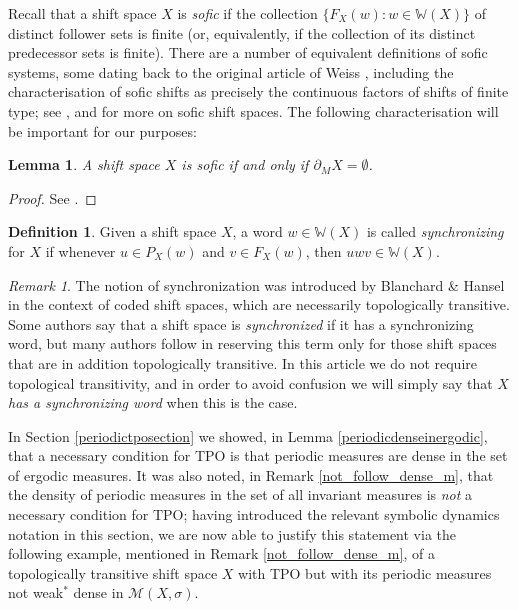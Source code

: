 \documentclass[reqno,11pt]{amsart}
\newtheorem{lem}[thm]{Lemma}
\theoremstyle{definition}
\newtheorem{defn}[thm]{Definition}
\theoremstyle{remark}
\theoremstyle{remark}
\newtheorem{rem}[thm]{Remark}
\def\m{\mathcal M}
\def\w{\mathbb{W}}
\numberwithin{equation}{section}
\begin{document}
Recall that a shift space $X$ is \emph{sofic} if the collection $\{F_X(w):w\in \w(X)\}$ of distinct follower sets is finite
(or, equivalently, if the collection of its distinct predecessor sets is finite).
There are a number of equivalent definitions of sofic systems, some dating back to the original article of Weiss
\cite{Wei73}, including the characterisation of sofic shifts as precisely the continuous factors of shifts of finite type;
see \cite[\S 3.2]{Bru22}, \cite[\S 6.1]{Kit98} and \cite[Ch.~3]{LM95} for more on sofic shift spaces.
The following characterisation will be important for our purposes:

\begin{lem}\label{sofic_iff_empty_boundary}
A shift space $X$ is sofic if and only if $\partial_M X=\emptyset$.
\end{lem}
\begin{proof}
See \cite[Thm.~2.3]{Tho06}.
\end{proof}


\begin{defn}\label{sync_defn}
Given a shift space $X$, a word $w\in\w(X)$ is called \emph{synchronizing} for $X$ if whenever
$u\in P_X(w)$ and $v\in F_X(w)$, then $uwv\in\w(X)$.
\end{defn}

\begin{rem}
The notion of synchronization was introduced by Blanchard \& Hansel \cite{BH86} in the context of coded shift spaces, which are necessarily topologically transitive. 
Some authors say that a shift space is \emph{synchronized} if it has a synchronizing word,
but many authors follow \cite{BH86} in reserving this term only for those shift spaces that are in addition 
topologically transitive.
In this article we do not require topological transitivity, and in order to avoid confusion we will simply say that $X$ \emph{has a synchronizing word} when this is the case.
\end{rem}

In Section \ref{periodictposection} we showed, in Lemma \ref{periodicdenseinergodic},
that a necessary condition for TPO is that
periodic measures are dense in the set of ergodic measures.
It was also noted, in Remark \ref{not_follow_dense_m}, that the density of periodic measures in the set of all invariant measures
is \emph{not} a necessary condition for TPO; having introduced the relevant symbolic dynamics notation
in this section, we are now able to justify this statement via the following example, 
mentioned in Remark \ref{not_follow_dense_m}, of a topologically transitive shift space $X$ with TPO but with its periodic
measures not weak$^*$ dense in $\m(X,\sigma)$.
\end{document}
